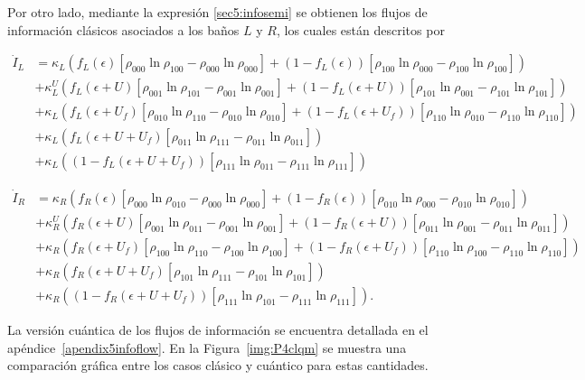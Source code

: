 Por otro lado, mediante la expresión \ref{sec5:infosemi} se obtienen los flujos de información clásicos asociados a los baños $L$ y $R$, los cuales están descritos por

\begin{align*}
  \dot{I}_{L}  &  =  \kappa_{L}(f_{L}(\epsilon)[\rho_{000}\ln \rho_{100} - \rho_{000}\ln \rho_{000}] + (1-f_{L}(\epsilon))[\rho_{100}\ln \rho_{000} - \rho_{100}\ln \rho_{100} ] )  \\ 
      & + \kappa^{U}_{L}(f_{L}(\epsilon + U)[\rho_{001}\ln \rho_{101} - \rho_{001}\ln \rho_{001}] + (1-f_{L}(\epsilon + U))[\rho_{101}\ln \rho_{001} -\rho_{101}\ln \rho_{101} ]   ) \\  
      & + \kappa_{L}( f_{L}(\epsilon + U_{f})[\rho_{010}\ln \rho_{110} -\rho_{010}\ln \rho_{010} ]  + (1-f_{L}(\epsilon + U_{f}))[\rho_{110}\ln \rho_{010} - \rho_{110}\ln \rho_{110} ] ) \\  
      & + \kappa_{L}( f_{L}(\epsilon + U + U_{f})[\rho_{011}\ln \rho_{111}- \rho_{011}\ln \rho_{011}]) \\   
      & + \kappa_{L}( (1-f_{L}(\epsilon+U+U_{f}) )[\rho_{111}\ln \rho_{011} - \rho_{111}\ln \rho_{111}])   
\end{align*}

\begin{align*}
 \dot{I}_{R} & =  \kappa_{R}(f_{R}(\epsilon)[\rho_{000}\ln \rho_{010} - \rho_{000}\ln \rho_{000}] + (1-f_{R}(\epsilon))[\rho_{010}\ln \rho_{000} - \rho_{010}\ln \rho_{010} ] )  \\ 
      & + \kappa^{U}_{R}(f_{R}(\epsilon + U)[\rho_{001}\ln \rho_{011} - \rho_{001}\ln \rho_{001}] + (1-f_{R}(\epsilon + U))[\rho_{011}\ln \rho_{001} -\rho_{011}\ln \rho_{011} ]   ) \\  
      & + \kappa_{R}( f_{R}(\epsilon + U_{f})[\rho_{100}\ln \rho_{110} - \rho_{100}\ln \rho_{100} ]  + (1-f_{R}(\epsilon + U_{f}))[\rho_{110}\ln \rho_{100} - \rho_{110}\ln \rho_{110} ] ) \\  
      & + \kappa_{R}( f_{R}(\epsilon + U + U_{f})[\rho_{101}\ln \rho_{111}- \rho_{101}\ln \rho_{101}]) \\   
      & + \kappa_{R}( (1-f_{R}(\epsilon+U+U_{f}) )[\rho_{111}\ln \rho_{101} - \rho_{111}\ln \rho_{111}]).   
\end{align*}

La versión cuántica de los flujos de información se encuentra detallada en el apéndice~\ref{apendix5infoflow}. En la Figura~\ref{img:P4clqm} se muestra una comparación gráfica entre los casos clásico y cuántico para estas cantidades.

